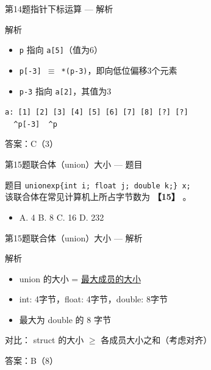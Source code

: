 \begin{frame}{第14题}{指针下标运算 --- 解析}
    \begin{alertblock}{解析}
        \footnotesize
        \begin{itemize}
            \setlength{\itemsep}{0pt}
            \item \texttt{p} 指向 \texttt{a[5]}（值为6）
            \item \texttt{p[-3] $\equiv$ *(p-3)}，即向低位偏移3个元素
            \item \texttt{p-3} 指向 \texttt{a[2]}，其值为3
        \end{itemize}
        \begin{center}
            \texttt{a: [1] [2] [3] [4] [5] [6] [7] [8] [?] [?]}\\
            \texttt{\qquad\ \  \^{}p[-3]\qquad\qquad\ \ \^{}p}
        \end{center}
        {\color{highlight}答案：C（3）}
    \end{alertblock}
\end{frame}

\begin{frame}{第15题}{联合体（union）大小 --- 题目}
    \begin{exampleblock}{题目}
        \texttt{unionexp\{int i; float j; double k;\} x;}\\
        该联合体在常见计算机上所占字节数为 \textbf{【15】} 。
        \begin{itemize}
            \setlength{\itemsep}{0pt}
            \item A. 4 \quad B. 8 \quad C. 16 \quad D. 232
        \end{itemize}
    \end{exampleblock}
\end{frame}

\begin{frame}{第15题}{联合体（union）大小 --- 解析}
    \begin{alertblock}{解析}
        \small
        \begin{itemize}
            \setlength{\itemsep}{0pt}
            \item union 的大小 = \underline{最大成员的大小}
            \item int: 4字节，float: 4字节，double: 8字节
            \item 最大为 double 的 8 字节
        \end{itemize}
        \vspace{0.3em}
        {\color{highlight}对比：} struct 的大小 $\geq$ 各成员大小之和（考虑对齐）

        \vspace{0.3em}
        {\color{highlight}答案：B（8）}
    \end{alertblock}
\end{frame}


